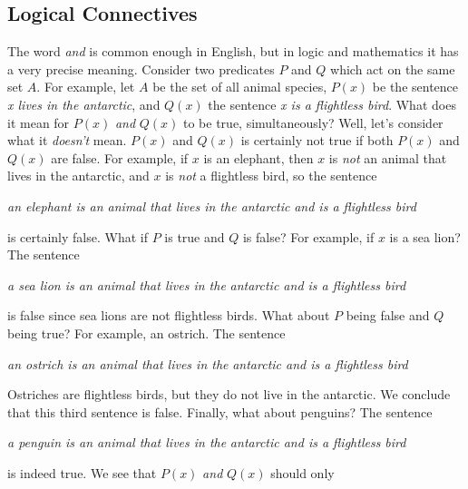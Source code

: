         \subsection{Logical Connectives}
            The word \textit{and} is common enough in English, but in logic and
            mathematics it has a very precise meaning. Consider two predicates
            $P$ and $Q$ which act on the same set $A$. For example, let $A$ be
            the set of all animal species, $P(x)$ be the sentence
            \textit{x lives in the antarctic}, and $Q(x)$ the sentence
            \textit{x is a flightless bird}. What does it mean for
            $P(x)$ \textit{and} $Q(x)$ to be true, simultaneously? Well, let's
            consider what it \textit{doesn't} mean. $P(x)$ and $Q(x)$ is
            certainly not true if both $P(x)$ and $Q(x)$ are false. For example,
            if $x$ is an elephant, then $x$ is \textit{not} an animal that lives
            in the antarctic, and $x$ is \textit{not} a flightless bird, so the
            sentence
            \begin{center}
                \textit{an elephant is an animal that lives in the antarctic}
                \textit{and is a flightless bird}
            \end{center}is certainly false. What if $P$ is true and $Q$ is
            false? For example, if $x$ is a sea lion?
            The sentence
            \begin{center}
                \textit{a sea lion is an animal that lives in the}
                \textit{antarctic and is a flightless bird}
            \end{center}
            is false since sea lions are not flightless birds. What about
            $P$ being false and $Q$ being true? For example, an ostrich.
            The sentence
            \begin{center}
                \textit{an ostrich is an animal that lives in the}
                \textit{antarctic and is a flightless bird}
            \end{center}
            Ostriches are flightless birds, but they do not live in the
            antarctic. We conclude that this third sentence is false. Finally,
            what about penguins? The sentence
            \begin{center}
                \textit{a penguin is an animal that lives in the}
                \textit{antarctic and is a flightless bird}
            \end{center}
            is indeed true. We see that $P(x)$ \textit{and} $Q(x)$ should only
